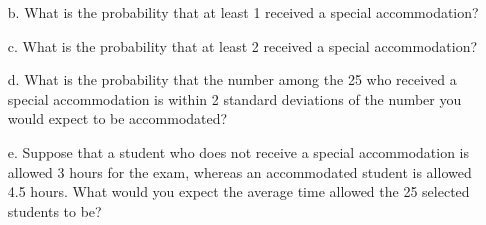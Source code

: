 \documentclass[letterpaper,12pt]{article}
\begin{document}
\begin{enumerate}
\begin{enumerate}
      \item[b.]
        What is the probability that at least 1 received a special accommodation?
      \item[c.]
        What is the probability that at least 2 received a special accommodation?
      \item[d.]
        What is the probability that the number among the 25 who received a special accommodation is within 2 standard deviations of the number you would expect to be accommodated?
      \item[e.]
        Suppose that a student who does not receive a special accommodation is allowed 3 hours for the exam, whereas an accommodated student is allowed 4.5 hours. What would you expect the average time allowed the 25 selected students to be?
    \end{enumerate}
\end{enumerate}
\end{document}
